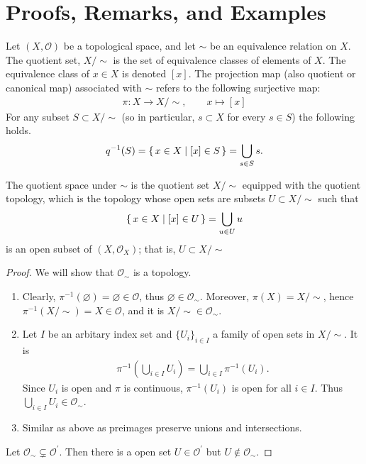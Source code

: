 \section{Proofs, Remarks, and Examples}
\begin{defbox}
    \begin{definition}
        Let \((X, \mathcal{O})\) be a {\color{mathif}topological space}, and let \(\sim\) be an {\color{mathif}equivalence relation} on \(X\). The {\color{maththen}quotient set}, \(X / \sim\) is the {\color{mathobj}set} of {\color{mathobj}equivalence classes} of elements of \(X\). The equivalence class of \(x \in X\) is {\color{mathrem}denoted} \([x]\). The {\color{maththen}projection map} (also {\color{mathrem}quotient} or {\color{mathrem}canonical map}) associated with \(\sim\) refers to the following {\color{mathif}surjective map}:
        \begin{align*}
            \pi: X \longrightarrow X / \sim, \qquad x \mapsto [x]
        \end{align*}
        For any subset \(S \subset X / \sim\) (so in particular, \(s \subset X\) for every \(s \in S\)) the following holds.
        \begin{align*}
            q^{-1}(S) = \left\{\, x \in X \mid [x] \in S \,\right\} = \bigcup_{s \in S} s \text{.}
        \end{align*}

        The quotient space under \(\sim\) is the quotient set \(X / \sim\) equipped with the quotient topology, which is the topology whose open sets are subsets \(U \subset X / \sim\) such that 
        \begin{align*}
            \left\{\, x \in X \mid [x] \in U \,\right\} = \bigcup_{u \in U}u
        \end{align*}
        is an open subset of \((X, \mathcal{O}_X)\); that is, \(U \subset X / \sim\)
    \end{definition}
\end{defbox}
%
\begin{proof}
    We will show that \(\mathcal{O}_\sim\) is a topology.
    \begin{enumerate}
        \item Clearly, \(\pi^{-1}(\varnothing) = \varnothing \in \mathcal{O}\), thus \(\varnothing \in \mathcal{O}_\sim\). Moreover, \(\pi(X) = X / \sim\), hence \(\pi^{-1}(X / \sim) = X \in \mathcal{O}\), and it is \(X / \sim \in \mathcal{O}_\sim\).
        \item Let \(I\) be an arbitary index set and \(\{U_i\}_{i \in I}\) a family of open sets in \(X / \sim\). It is
        \begin{align}
            \pi^{-1}\left( \bigcup_{i \in I} U_i \right) = \bigcup_{i \in I} \pi^{-1}(U_i) \text{.}
        \end{align}
        Since \(U_i\) is open and \(\pi\) is continuous, \(\pi^{-1}(U_i)\) is open for all \(i \in I\). Thus \(\bigcup_{i \in I} U_i \in \mathcal{O}_\sim\).
        \item Similar as above as preimages preserve unions and intersections.
    \end{enumerate}
    Let \(\mathcal{O}_\sim \subsetneq \mathcal{O}^\prime\). Then there is a open set \(U \in \mathcal{O}^\prime\) but \(U \not\in \mathcal{O}_\sim\).
\end{proof}
